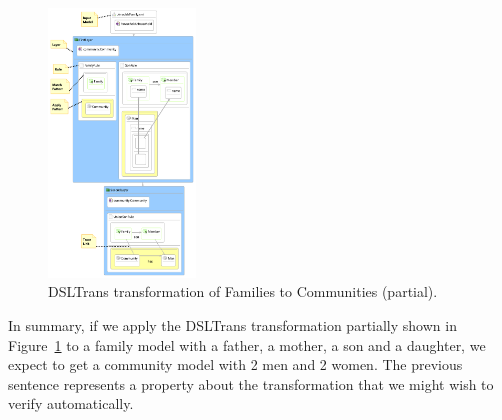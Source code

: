 \begin{figure}
\begin{center}
  \includegraphics[width=0.35\textwidth]{figures/families_to_persons_hot2}
  \caption{DSLTrans transformation of Families to Communities (partial).}
  \label{fig:families_mm}
\end{center}
\end{figure}

In summary, if we apply the DSLTrans transformation partially shown in 
Figure~\ref{fig:families_mm} to a family model with a father, a mother, a son
and a daughter, we expect to get a community model with 2 men and 2 women. The
previous sentence represents a property about the transformation that we might
wish to verify automatically.


